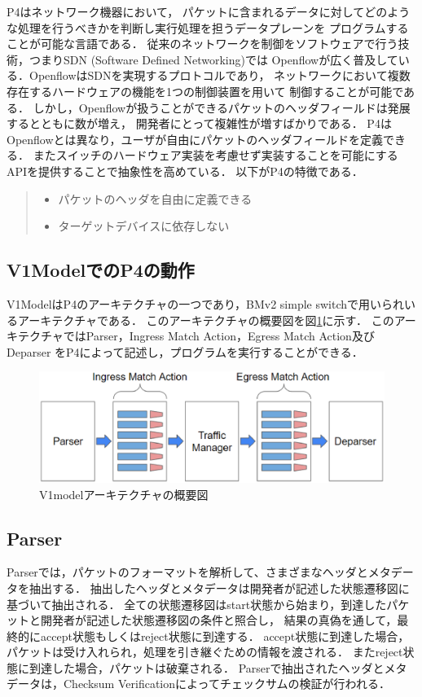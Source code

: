 \documentclass[a4j,11pt]{jreport}
\begin{document}
P4はネットワーク機器において，
パケットに含まれるデータに対してどのような処理を行うべきかを判断し実行処理を担うデータプレーンを
プログラムすることが可能な言語である．
従来のネットワークを制御をソフトウェアで行う技術，つまりSDN
(Software Defined Networking)では
Openflowが広く普及している．OpenflowはSDNを実現するプロトコルであり，
ネットワークにおいて複数存在するハードウェアの機能を1つの制御装置を用いて
制御することが可能である．
しかし，Openflowが扱うことができるパケットのヘッダフィールドは発展するとともに数が増え，
開発者にとって複雑性が増すばかりである．
P4はOpenflowとは異なり，ユーザが自由にパケットのヘッダフィールドを定義できる．
またスイッチのハードウェア実装を考慮せず実装することを可能にするAPIを提供することで抽象性を高めている．
以下がP4の特徴である．

\begin{quote}
  \begin{itemize}
    \item パケットのヘッダを自由に定義できる
    \item ターゲットデバイスに依存しない
  \end{itemize}
\end{quote}

\subsection{V1ModelでのP4の動作}
V1ModelはP4のアーキテクチャの一つであり，BMv2 simple switchで用いられいるアーキテクチャである．
このアーキテクチャの概要図を図\ref{fig:v1model}に示す．
このアーキテクチャではParser，Ingress Match Action，Egress Match Action及びDeparser
をP4によって記述し，プログラムを実行することができる．

\begin{figure}[htbp]
  \centering
  \includegraphics[scale=0.61]{data/v1model.eps}
  \vspace{0mm}
  \caption{V1modelアーキテクチャの概要図}
  \label{fig:v1model}
\end{figure}

\subsection{Parser}
Parserでは，パケットのフォーマットを解析して、さまざまなヘッダとメタデータを抽出する．
抽出したヘッダとメタデータは開発者が記述した状態遷移図に基づいて抽出される．
全ての状態遷移図はstart状態から始まり，到達したパケットと開発者が記述した状態遷移図の条件と照合し，
結果の真偽を通して，最終的にaccept状態もしくはreject状態に到達する．
accept状態に到達した場合，パケットは受け入れられ，処理を引き継ぐための情報を渡される．
またreject状態に到達した場合，パケットは破棄される．
Parserで抽出されたヘッダとメタデータは，Checksum Verificationによってチェックサムの検証が行われる．
\end{document}
